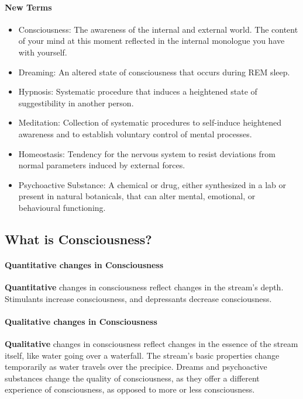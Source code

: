 \documentclass[10pt,letter]{article}
\theoremstyle{plain}
\theoremstyle{definition}
\begin{document}
\paragraph{New Terms}
\begin{itemize}
    \item Consciousness: The awareness of the internal and external world. The content of your mind at this moment reflected in the internal monologue you have with yourself.
    \item Dreaming: An altered state of consciousness that occurs during REM sleep. 
    \item Hypnosis: Systematic procedure that induces a heightened state of suggestibility in another person. 
    \item Meditation: Collection of systematic procedures to self-induce heightened awareness and to establish voluntary control of mental processes. 
    \item Homeostasis: Tendency for the nervous system to resist deviations from normal parameters induced by external forces.
    \item Psychoactive Substance: A chemical or drug, either synthesized in a lab or present in natural botanicals, that can alter mental, emotional, or behavioural functioning.
\end{itemize}

\subsection*{What is Consciousness?}
\paragraph{Quantitative changes in Consciousness}
\textbf{Quantitative} changes in consciousness reflect changes in the stream's depth. Stimulants increase consciousness, and depressants decrease consciousness. 

\paragraph{Qualitative changes in Consciousness}
\textbf{Qualitative} changes in consciousness reflect changes in the essence of the stream itself, like water going over a waterfall. The stream's basic properties change temporarily as water travels over the precipice. Dreams and psychoactive substances change the quality of consciousness, as they offer a different experience of consciousness, as opposed to more or less consciousness. 
\end{document}

